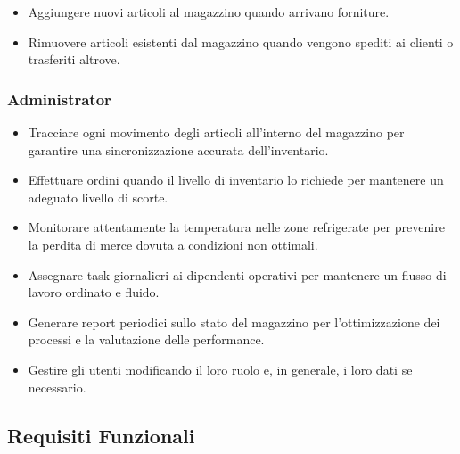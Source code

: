 \begin{itemize}
    \item Aggiungere nuovi articoli al magazzino quando arrivano forniture.
    \item Rimuovere articoli esistenti dal magazzino quando vengono spediti ai clienti o trasferiti altrove.
\end{itemize}

\subsubsection{Administrator}

\begin{itemize}
    \item Tracciare ogni movimento degli articoli all'interno del magazzino per garantire una sincronizzazione accurata dell'inventario.
    \item Effettuare ordini quando il livello di inventario lo richiede per mantenere un adeguato livello di scorte.
    \item Monitorare attentamente la temperatura nelle zone refrigerate per prevenire la perdita di merce dovuta a condizioni non ottimali.
    \item Assegnare task giornalieri ai dipendenti operativi per mantenere un flusso di lavoro ordinato e fluido.
    \item Generare report periodici sullo stato del magazzino per l'ottimizzazione dei processi e la valutazione delle performance.
    \item Gestire gli utenti modificando il loro ruolo e, in generale, i loro dati se necessario.
\end{itemize}

\subsection{Requisiti Funzionali}

